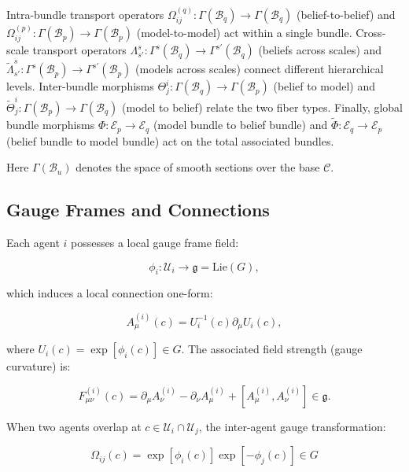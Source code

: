 \documentclass[twoside,11pt]{article}
\begin{document}
Intra-bundle transport operators $\Omega^{(q)}_{ij}: \Gamma(\mathcal{B}_q) \to \Gamma(\mathcal{B}_q)$ (belief-to-belief) and $\Omega^{(p)}_{ij}: \Gamma(\mathcal{B}_p) \to \Gamma(\mathcal{B}_p)$ (model-to-model) act within a single bundle. Cross-scale transport operators $\Lambda^{s}_{s'}: \Gamma^{s}(\mathcal{B}_q) \to \Gamma^{s'}(\mathcal{B}_q)$ (beliefs across scales) and $\tilde{\Lambda}^{s}_{s'}: \Gamma^{s}(\mathcal{B}_p) \to \Gamma^{s'}(\mathcal{B}_p)$ (models across scales) connect different hierarchical levels. Inter-bundle morphisms $\Theta^i_j: \Gamma(\mathcal{B}_q) \to \Gamma(\mathcal{B}_p)$ (belief to model) and $\tilde{\Theta}^i_j: \Gamma(\mathcal{B}_p) \to \Gamma(\mathcal{B}_q)$ (model to belief) relate the two fiber types. Finally, global bundle morphisms $\Phi: \mathcal{E}_p \to \mathcal{E}_q$ (model bundle to belief bundle) and $\tilde{\Phi}: \mathcal{E}_q \to \mathcal{E}_p$ (belief bundle to model bundle) act on the total associated bundles.

Here $\Gamma(\mathcal{B}_u)$ denotes the space of smooth sections over the base $\mathcal{C}$.

\subsection{Gauge Frames and Connections}
Each agent $i$ possesses a local gauge frame field:

\begin{equation}
\phi_i: \mathcal{U}_i \to \mathfrak{g} = \text{Lie}(G),
\end{equation}

which induces a local connection one-form:

\begin{equation}
A^{(i)}_\mu(c) = U_i^{-1}(c) \partial_\mu U_i(c),
\end{equation}

where $U_i(c) = \exp[\phi_i(c)] \in G$. The associated field strength (gauge curvature) is:

\begin{equation}
F^{(i)}_{\mu\nu}(c) = \partial_\mu A^{(i)}_\nu - \partial_\nu A^{(i)}_\mu + [A^{(i)}_\mu, A^{(i)}_\nu] \in \mathfrak{g}.
\end{equation}

When two agents overlap at $c \in \mathcal{U}_i \cap \mathcal{U}_j$, the inter-agent gauge transformation:

\begin{equation}
\Omega_{ij}(c) = \exp[\phi_i(c)] \exp[-\phi_j(c)] \in G
\end{equation}
\end{document}
